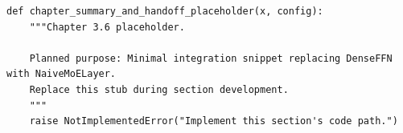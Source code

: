 \begin{lstlisting}[style=bookpython,caption={Planned code placeholder for chapter summary and handoff.},label={lst:ch03-chapter-summary-and-handoff}]
def chapter_summary_and_handoff_placeholder(x, config):
    """Chapter 3.6 placeholder.

    Planned purpose: Minimal integration snippet replacing DenseFFN with NaiveMoELayer.
    Replace this stub during section development.
    """
    raise NotImplementedError("Implement this section's code path.")
\end{lstlisting}
